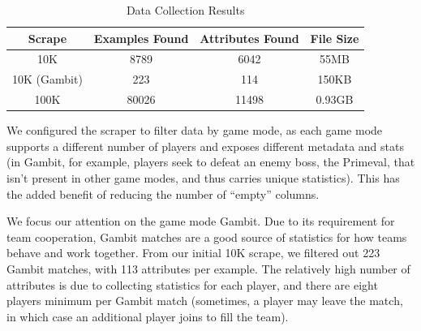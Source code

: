 \documentclass[conference]{IEEEtran}
\begin{document}
%
\begin{table}[htbp]
    \caption{Data Collection Results}
    \begin{center}
        \begin{tabular}{|c|c|c|c|}
            \hline
            \textbf{Scrape} & \textbf{Examples Found} & \textbf{Attributes Found} & \textbf{File Size} \\
            \hline
            10K             & 8789                    & 6042                      & 55MB               \\
            10K (Gambit)    & 223                     & 114                       & 150KB              \\
            100K            & 80026                   & 11498                     & 0.93GB             \\
            \hline
        \end{tabular}
        \label{tab1}
    \end{center}
\end{table}

We configured the scraper to filter data by game mode, as each game mode
supports a different number of players and exposes different metadata and stats
(in Gambit, for example, players seek to defeat an enemy boss, the Primeval,
that isn't present in other game modes, and thus carries unique statistics).
This has the added benefit of reducing the number of ``empty'' columns.

We focus our attention on the game mode Gambit. Due to its requirement for team
cooperation, Gambit matches are a good source of statistics for how teams
behave and work together. From our initial 10K scrape, we filtered out 223
Gambit matches, with 113 attributes per example. The relatively high number of
attributes is due to collecting statistics for each player, and there are eight
players minimum per Gambit match (sometimes, a player may leave the match, in
which case an additional player joins to fill the team).
\end{document}
